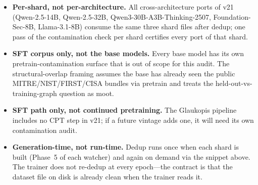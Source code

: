 \documentclass[webpdf,contemporary,large]{oup-authoring-template}
\theoremstyle{thmstyleone}
\theoremstyle{thmstyletwo}
\theoremstyle{thmstylethree}
\begin{document}
\begin{itemize}
  \item \textbf{Per-shard, not per-architecture.} All cross-architecture ports of v21 (Qwen-2.5-14B, Qwen-2.5-32B, Qwen3-30B-A3B-Thinking-2507, Foundation-Sec-8B, Llama-3.1-8B) consume the same three shard files after dedup; one pass of the contamination check per shard certifies every port of that shard.
  \item \textbf{SFT corpus only, not the base models.} Every base model has its own pretrain-contamination surface that is out of scope for this audit. The structural-overlap framing assumes the base has already seen the public MITRE/NIST/FIRST/CISA bundles via pretrain and treats the held-out-vs-training-graph question as moot.
  \item \textbf{SFT path only, not continued pretraining.} The Glaukopis pipeline includes no CPT step in v21; if a future vintage adds one, it will need its own contamination audit.
  \item \textbf{Generation-time, not run-time.} Dedup runs once when each shard is built (Phase~5 of each watcher) and again on demand via the snippet above. The trainer does not re-dedup at every epoch---the contract is that the dataset file on disk is already clean when the trainer reads it.
\end{itemize}



\end{document}
